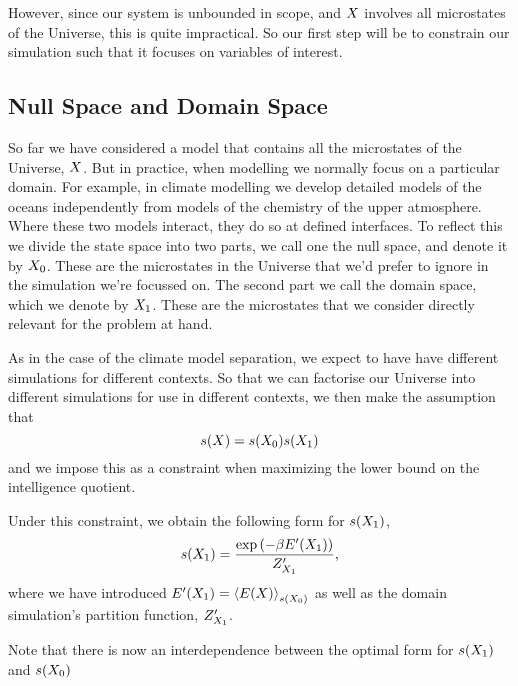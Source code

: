 \documentclass[]{article}
\begin{document}
However, since our system is unbounded in scope, and $X$ involves all microstates of the Universe, this is quite impractical. So our first step will be to constrain our simulation such that it focuses on variables of interest.

\subsection{Null Space and Domain Space}

So far we have considered a model that contains all the microstates of the Universe, $X$. But in practice, when modelling we normally focus on a particular domain. For example, in climate modelling we develop detailed models of the oceans independently from models of the chemistry of the upper atmosphere. Where these two models interact, they do so at defined interfaces. To reflect this we divide the state space into two parts, we call one the null space, and denote it by ${X_0}$. These are the microstates in the Universe that we'd prefer to ignore in the simulation we're focussed on. The second part we call the domain space, which we denote by ${X_1}$. These are the microstates that we consider directly relevant for the problem at hand. 

As in the case of the climate model separation, we expect to have have different simulations for different contexts. So that we can factorise our Universe into different simulations for use in different contexts, we then make the assumption that
\[
s(X) = s({X_0}) s({X_1})
\]
and we impose this as a constraint when maximizing the lower bound on the intelligence quotient.

Under this constraint, we obtain the following form for $s({X_1})$,
\[
s({X_1}) = \frac{\exp \left(-\beta E^\prime({X_1})\right)}{Z^\prime_{X_1}},
\]
where we have introduced $E^\prime({X_1}) = \left\langle E(X) \right\rangle_{s({X_0})}$ as well as the domain simulation's partition function, $Z^\prime_{X_1}$.

Note that there is now an interdependence between the optimal form for $s({X_1})$ and $s({X_0})$
\end{document}
